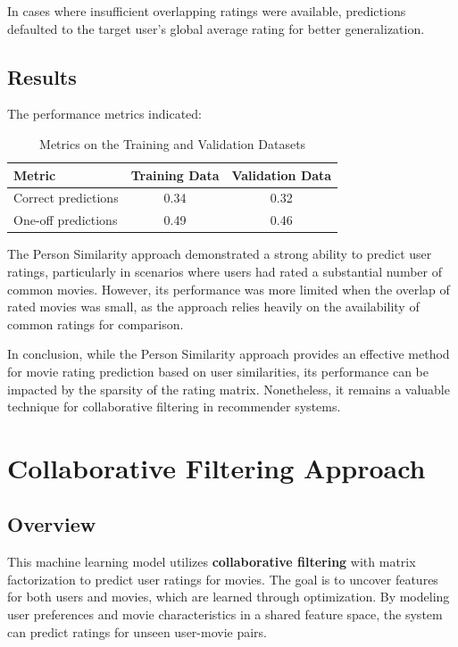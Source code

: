 \documentclass[a4paper,9pt]{article}
\begin{document}
In cases where insufficient overlapping ratings were available, predictions defaulted to the target user's global average rating for better generalization.

\subsection{Results}
The performance metrics indicated:

\begin{table}[ht]
	\centering
	\begin{tabular}{|l|c|c|}
		\hline
		\textbf{Metric}     & \textbf{Training Data} & \textbf{Validation Data} \\ \hline
		Correct predictions & 0.34                   & 0.32                     \\ \hline
		One-off predictions & 0.49                   & 0.46                     \\ \hline
	\end{tabular}
	\caption{Metrics on the Training and Validation Datasets}
	\label{tab:person_similarity_results}
\end{table}

The Person Similarity approach demonstrated a strong ability to predict user ratings,
particularly in scenarios where users had rated a substantial number of common movies.
However, its performance was more limited when the overlap of rated movies was small, as the approach relies heavily
on the availability of common ratings for comparison.

In conclusion, while the Person Similarity approach provides an effective method for movie rating prediction based on user
similarities, its performance can be impacted by the sparsity of the rating matrix.
Nonetheless, it remains a valuable technique for collaborative filtering in recommender systems.

\clearpage
\section{Collaborative Filtering Approach}


\subsection{Overview}

This machine learning model utilizes \textbf{collaborative filtering} with matrix factorization to predict user ratings for movies. The goal is to uncover features for both users and movies, which are learned through optimization. By modeling user preferences and movie characteristics in a shared feature space, the system can predict ratings for unseen user-movie pairs.
\end{document}
